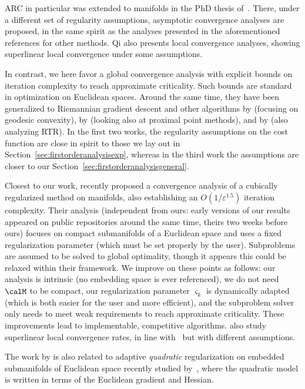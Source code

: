 ARC in particular was extended to manifolds in the PhD thesis of~\citet{qi2011thesis}. There, under a different set of regularity assumptions, asymptotic convergence analyses are proposed, in the same spirit as the analyses presented in the aforementioned references for other methods. Qi also presents local convergence analyses, showing superlinear local convergence under some assumptions.

In contrast, we here favor a global convergence analysis with explicit bounds on iteration complexity to reach approximate criticality.
Such bounds are standard in optimization on Euclidean spaces. Around the same time, they have been generalized to Riemannian gradient descent and other algorithms by \citet{zhang2016complexitygeodesicallyconvex} (focusing on geodesic convexity), by \citet{bento2017iterationcomplexity} (looking also at proximal point methods), and by \citet{boumal2016globalrates} (also analyzing RTR). In the first two works, the regularity assumptions on the cost function are close in spirit to those we lay out in Section~\ref{sec:firstorderanalysisexp}, whereas in the third work the assumptions are closer to our Section~\ref{sec:firstorderanalysisgeneral}.

Closest to our work, \citet{zhang2018cubicregmanifold} recently proposed a convergence analysis of a cubically regularized method on manifolds, also establishing an $O(1/\varepsilon^{1.5})$ iteration complexity. Their analysis (independent from ours: early versions of our results appeared on public repositories around the same time, theirs two weeks before ours) focuses on compact submanifolds of a Euclidean space and uses a fixed regularization parameter (which must be set properly by the user). Subproblems are assumed to be solved to global optimality, though it appears this could be relaxed within their framework. We improve on these points as follows: our analysis is intrinsic (no embedding space is ever referenced), we do not need $\calM$ to be compact, our regularization parameter $\varsigma_k$ is dynamically adapted (which is both easier for the user and more efficient), and the subproblem solver only needs to meet weak requirements to reach approximate criticality. These improvements lead to implementable, competitive algorithms. \citet{zhang2018cubicregmanifold} also study superlinear local convergence rates, in line with~\citet{qi2011thesis} but with different assumptions.

The work by \citet{zhang2018cubicregmanifold} is also related to adaptive \emph{quadratic} regularization on embedded submanifolds of Euclidean space recently studied by~\citet{hu2017adaptive}, where the quadratic model is written in terms of the Euclidean gradient and Hessian.

